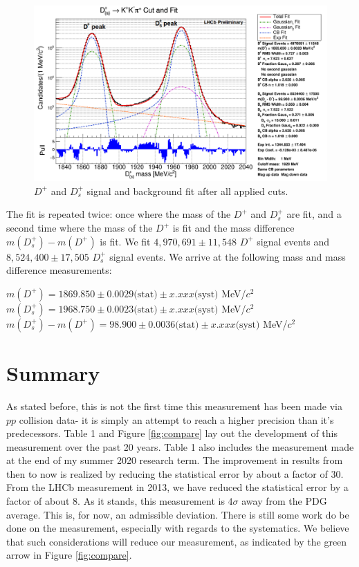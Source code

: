 \documentclass[12pt, letterpaper]{article}
\begin{document}
\begin{figure}[h!]
\centering
\includegraphics[width=0.9\linewidth]{bigfit.png}
\caption{$D^+$ and $D^+_s$ signal and background fit after all applied cuts.}
\label{fig:fit}
\end{figure}


The fit is repeated twice: once where the mass of the $D^+$ and $D^+_s$ are fit, and a second time where the mass of the $D^+$ is fit and the mass difference $m(D^+_s) - m(D^+)$ is fit. We fit $4,970,691 \pm 11,548$ $D^+$ signal events and $8,524,400 \pm 17,505$ $D^+_s$ signal events. We arrive at the following mass and mass difference measurements:

\begin{center}
$m(D^+) = 1869.850 \pm 0.0029\text{(stat)} \pm x.xxx\text{(syst)}$ MeV/$c^2$\\
$m(D^+_s) = 1968.750 \pm 0.0023\text{(stat)} \pm x.xxx\text{(syst)}$ MeV/$c^2$\\
$m(D^+_s) - m(D^+) = 98.900 \pm 0.0036\text{(stat)} \pm x.xxx\text{(syst)}$ MeV/$c^2$\\
\end{center}




\section{Summary}
As stated before, this is not the first time this measurement has been made via $pp$ collision data- it is simply an attempt to reach a higher precision than it's predecessors. Table 1 and Figure \ref{fig:compare} lay out the development of this measurement over the past 20 years. Table 1 also includes the measurement made at the end of my summer 2020 research term. The improvement in results from then to now is realized by reducing the statistical error by about a factor of 30. From the LHCb measurement in 2013, we have reduced the statistical error by a factor of about 8. As it stands, this measurement is $4\sigma$ away from the PDG average. This is, for now, an admissible deviation. There is still some work do be done on the measurement, especially with regards to the systematics. We believe that such considerations will reduce our measurement, as indicated by the green arrow in Figure \ref{fig:compare}.
\end{document}
